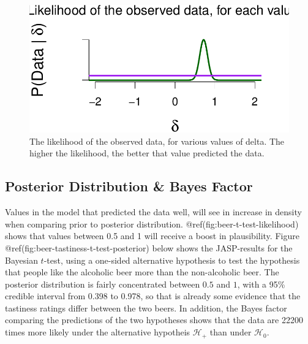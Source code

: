\documentclass[
  letterpaper,
  DIV=11,
  numbers=noendperiod]{scrreprt}
\begin{document}
\begin{figure}

{\centering \includegraphics[width=1\textwidth,height=\textheight]{05-more-tests_files/figure-pdf/beer-t-test-likelihood-1.pdf}

}

\caption{The likelihood of the observed data, for various values of
delta. The higher the likelihood, the better that value predicted the
data.}

\end{figure}

\hypertarget{posterior-distribution-bayes-factor}{%
\subsection{Posterior Distribution \& Bayes
Factor}\label{posterior-distribution-bayes-factor}}

Values in the model that predicted the data well, will see in increase
in density when comparing prior to posterior distribution.
@ref(fig:beer-t-test-likelihood) shows that values between 0.5 and 1
will receive a boost in plausibility. Figure
@ref(fig:beer-tastiness-t-test-posterior) below shows the JASP-results
for the Bayesian \(t\)-test, using a one-sided alternative hypothesis to
test the hypothesis that people like the alcoholic beer more than the
non-alcoholic beer. The posterior distribution is fairly concentrated
between \(0.5\) and \(1\), with a 95\% credible interval from 0.398 to
0.978, so that is already some evidence that the tastiness ratings
differ between the two beers. In addition, the Bayes factor comparing
the predictions of the two hypotheses shows that the data are 22200
times more likely under the alternative hypotheis \(\mathcal{H}_{+}\)
than under \(\mathcal{H}_{0}\).
\end{document}
